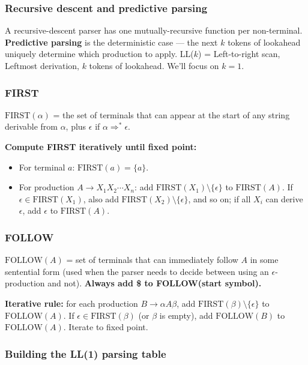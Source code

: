 \documentclass[11pt,a4paper]{article}
\begin{document}
\subsubsection*{Recursive descent and predictive parsing}

A recursive-descent parser has one mutually-recursive function per non-terminal. \textbf{Predictive parsing} is the deterministic case --- the next $k$ tokens of lookahead uniquely determine which production to apply. LL($k$) = Left-to-right scan, Leftmost derivation, $k$ tokens of lookahead. We'll focus on $k=1$.

\subsubsection*{FIRST}

$\text{FIRST}(\alpha)$ = the set of terminals that can appear at the start of any string derivable from $\alpha$, plus $\epsilon$ if $\alpha \Rightarrow^* \epsilon$.

\textbf{Compute FIRST iteratively until fixed point:}
\begin{itemize}[leftmargin=*,itemsep=0pt]
  \item For terminal $a$: $\text{FIRST}(a) = \{a\}$.
  \item For production $A \to X_1 X_2 \cdots X_n$: add $\text{FIRST}(X_1) \setminus \{\epsilon\}$ to $\text{FIRST}(A)$. If $\epsilon \in \text{FIRST}(X_1)$, also add $\text{FIRST}(X_2) \setminus \{\epsilon\}$, and so on; if all $X_i$ can derive $\epsilon$, add $\epsilon$ to $\text{FIRST}(A)$.
\end{itemize}

\subsubsection*{FOLLOW}

$\text{FOLLOW}(A)$ = set of terminals that can immediately follow $A$ in some sentential form (used when the parser needs to decide between using an $\epsilon$-production and not). \textbf{Always add \$ to FOLLOW(start symbol).}

\textbf{Iterative rule:} for each production $B \to \alpha A \beta$, add $\text{FIRST}(\beta) \setminus \{\epsilon\}$ to $\text{FOLLOW}(A)$. If $\epsilon \in \text{FIRST}(\beta)$ (or $\beta$ is empty), add $\text{FOLLOW}(B)$ to $\text{FOLLOW}(A)$. Iterate to fixed point.

\subsubsection*{Building the LL(1) parsing table}
\end{document}

